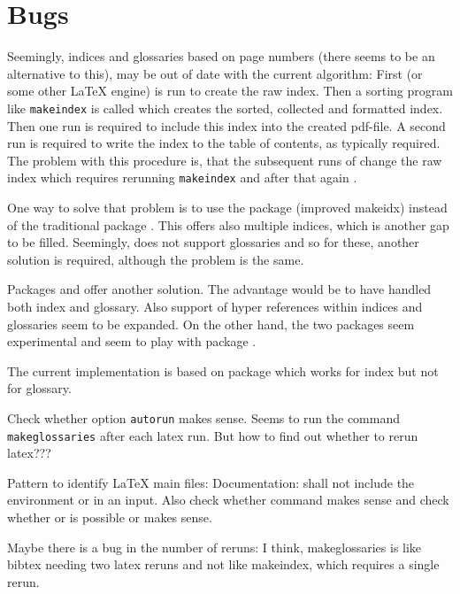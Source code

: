 \chapter{Bugs}\label{chap:bugs}

Seemingly, indices and glossaries based on page numbers 
(there seems to be an alternative to this), 
may be out of date with the current algorithm: 
First \lualatex{} (or some other \LaTeX{} engine) is run to create the raw index. 
Then a sorting program like \texttt{makeindex} is called 
which creates the sorted, collected and formatted index. 
Then one \lualatex{} run is required to include this index 
into the created pdf-file. 
A second \lualatex{} run is required 
to write the index to the table of contents, as typically required. 
The problem with this procedure is, 
that the subsequent runs of \lualatex{} change the raw index 
which requires rerunning \texttt{makeindex} 
and after that again \lualatex. 

One way to solve that problem is to use the package  
(improved makeidx) instead of the traditional package . 
This offers also multiple indices, which is another gap to be filled. 
Seemingly,  does not support glossaries 
and so for these, another solution is required, 
although the problem is the same. 

Packages  and  
offer another solution. 
The advantage would be to have handled both index and glossary. 
Also support of hyper references within indices and glossaries seem to be expanded. 
On the other hand, the two packages seem experimental 
and seem to play with package . 

The current implementation is based on package  
which works for index but not for glossary. 

Check whether  option \texttt{autorun} makes sense. 
Seems to run the command \texttt{makeglossaries} after each latex run. 
But how to find out whether to rerun latex??? 

Pattern to identify \LaTeX{} main files: 
Documentation: shall not include the environment 
 or  in an input. 
Also check whether command  makes sense 
and check whether  or  is possible %
or makes sense. 

Maybe there is a bug in the number of reruns: 
I think, makeglossaries is like bibtex needing two latex reruns 
and not like makeindex, which requires a single rerun. 

